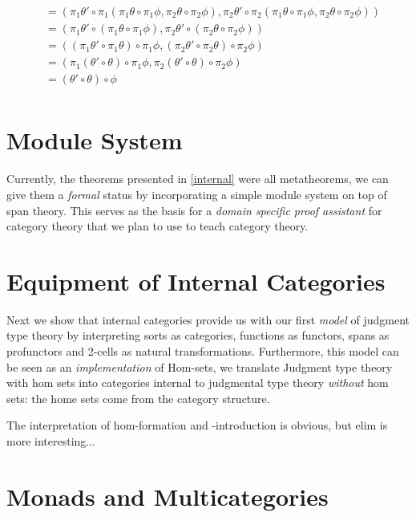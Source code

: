 \documentclass{article}
\begin{document}
\begin{definition}
\begin{enumerate}
\begin{align*}
      &= (\pi_1 \theta' \circ \pi_1(\pi_1 \theta \circ \pi_1 \phi, \pi_2 \theta \circ \pi_2 \phi),
      \pi_2 \theta' \circ \pi_2(\pi_1 \theta \circ \pi_1 \phi, \pi_2 \theta \circ \pi_2 \phi))\\
      &= (\pi_1 \theta' \circ (\pi_1 \theta \circ \pi_1 \phi), \pi_2 \theta' \circ (\pi_2 \theta \circ \pi_2 \phi))\\
      &= ((\pi_1 \theta' \circ \pi_1 \theta) \circ \pi_1 \phi, (\pi_2 \theta' \circ \pi_2 \theta) \circ \pi_2 \phi)\\
      &= (\pi_1(\theta' \circ \theta) \circ \pi_1 \phi, \pi_2(\theta' \circ \theta) \circ \pi_2 \phi)\\
      &= (\theta' \circ \theta) \circ \phi \\
    \end{align*}
  \end{enumerate}
\end{definition}


\section{Module System}

Currently, the theorems presented in \ref{internal} were all
metatheorems, we can give them a \emph{formal} status by incorporating
a simple module system on top of span theory.
%
This serves as the basis for a \emph{domain specific proof assistant}
for category theory that we plan to use to teach category theory.


\section{Equipment of Internal Categories}

Next we show that internal categories provide us with our first
\emph{model} of judgment type theory by interpreting sorts as
categories, functions as functors, spans as profunctors and 2-cells as
natural transformations.
%
Furthermore, this model can be seen as an \emph{implementation} of
Hom-sets, we translate Judgment type theory with hom sets into
categories internal to judgmental type theory \emph{without} hom sets:
the home sets come from the category structure.

The interpretation of hom-formation and -introduction is obvious, but
elim is more interesting...

\section{Monads and Multicategories}
\end{document}
